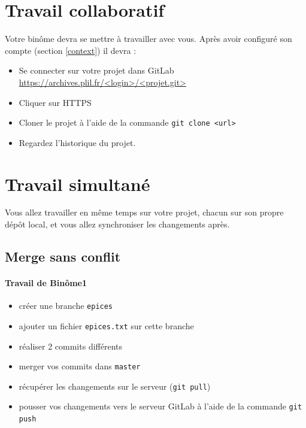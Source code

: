 \documentclass[final, a4paper, openbib, ]{article}
\begin{document}
\section{Travail collaboratif}

Votre binôme devra se mettre à travailler avec vous.
Après avoir configuré son compte (section \ref{context}) il devra :
\begin{itemize}
\item Se connecter sur votre projet dans GitLab \url{https://archives.plil.fr/<login>/<projet.git>}
\item Cliquer sur HTTPS
\item Cloner le projet à l'aide de la commande \texttt{git clone <url>}
\item Regardez l'historique du projet.
\end{itemize}

\section{Travail simultané}

Vous allez travailler en même temps sur votre projet, chacun sur son propre dépôt local, et vous allez synchroniser les changements après.

\subsection{Merge sans conflit}

\paragraph{Travail de Binôme1}
\begin{itemize}
\item créer une branche \texttt{epices}
\item ajouter un fichier \texttt{epices.txt} sur cette branche
\item réaliser 2 commits différents
\item merger vos commits dans \texttt{master}
\item récupérer les changements sur le serveur (\texttt{git pull})
\item pousser vos changements vers le serveur GitLab à l'aide de la commande \texttt{git push}
\end{itemize}
\end{document}

